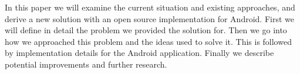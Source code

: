 In this paper we will examine the current situation and existing approaches, and derive a new solution with an open source implementation for Android.
First we will define in detail the problem we provided the solution for.
Then we go into how we approached this problem and the ideas used to solve it.
This is followed by implementation details for the Android application.
Finally we describe potential improvements and further research.